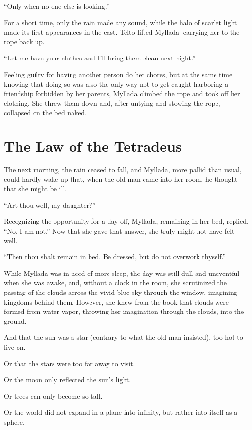``Only when no one else is looking.''

For a short time, only the rain made any sound, while the halo of scarlet light made its first appearances in the east. Telto lifted Myllada, carrying her to the rope back up.

``Let me have your clothes and I'll bring them clean next night.''

Feeling guilty for having another person do her chores, but at the same time knowing that doing so was also the only way not to get caught harboring a friendship forbidden by her parents, Myllada climbed the rope and took off her clothing. She threw them down and, after untying and stowing the rope, collapsed on the bed naked.

\chapter{The Law of the Tetradeus}

The next morning, the rain ceased to fall, and Myllada, more pallid than usual, could hardly wake up that, when the old man came into her room, he thought that she might be ill.

``Art thou well, my daughter?''

Recognizing the opportunity for a day off, Myllada, remaining in her bed, replied, ``No, I am not.'' Now that she gave that answer, she truly might not have felt well.

``Then thou shalt remain in bed. Be dressed, but do not overwork thyself.''

\centeredstars

While Myllada was in need of more sleep, the day was still dull and uneventful when she was awake, and, without a clock in the room, she scrutinized the passing of the clouds across the vivid blue sky through the window, imagining kingdoms behind them. However, she knew from the book that clouds were formed from water vapor, throwing her imagination through the clouds, into the ground.

And that the sun was a star (contrary to what the old man insisted), too hot to live on.

Or that the stars were too far away to visit.

Or the moon only reflected the sun's light.

Or trees can only become so tall.

Or the world did not expand in a plane into infinity, but rather into itself as a sphere.

